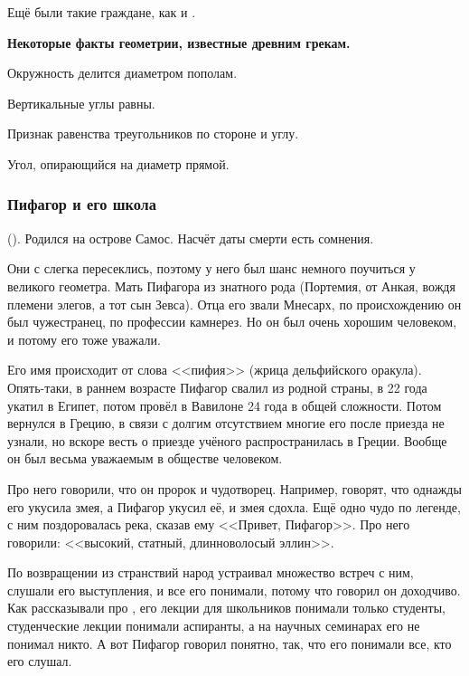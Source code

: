 \documentclass[a4paper,oneside,fleqn,10pt]{article}
\begin{document}
Ещё были такие граждане, как  и .

\textbf{Некоторые факты геометрии, известные древним грекам.}

\begin{items}{-2}
\item Окружность делится диаметром пополам.
\item Вертикальные углы равны.
\item Признак равенства треугольников по стороне и углу.
\item Угол, опирающийся на диаметр прямой.
\end{items}

\subsubsection{Пифагор и его школа}

 (). Родился на острове Самос.
Насчёт даты смерти есть сомнения.

Они с  слегка пересеклись, поэтому у него был
шанс немного поучиться у великого геометра.  Мать Пифагора из знатного
рода (Портемия, от Анкая, вождя племени элегов, а тот сын Зевса).
Отца его звали Мнесарх, по происхождению он был чужестранец, по
профессии камнерез.  Но он был очень хорошим человеком, и потому его
тоже уважали.

Его имя происходит от слова <<пифия>> (жрица дельфийского
оракула). Опять-таки, в раннем возрасте Пифагор свалил из родной
страны, в 22 года укатил в Египет, потом провёл в Вавилоне 24 года в
общей сложности. Потом вернулся в Грецию, в связи с долгим отсутствием
многие его после приезда не узнали, но вскоре весть о приезде учёного
распространилась в Греции. Вообще он был весьма уважаемым в обществе
человеком.

Про него говорили, что он пророк и чудотворец. Например, говорят, что
однажды его укусила змея, а Пифагор укусил её, и змея сдохла.  Ещё
одно чудо по легенде, с ним поздоровалась река, сказав ему <<Привет,
Пифагор>>.  Про него говорили: <<высокий, статный, длинноволосый
эллин>>.

По возвращении из странствий народ устраивал множество встреч с ним,
слушали его выступления, и все его понимали, потому что говорил он
доходчиво.  Как рассказывали про , его
лекции для школьников понимали только студенты, студенческие лекции
понимали аспиранты, а на научных семинарах его не понимал никто.  А
вот Пифагор говорил понятно, так, что его понимали все, кто его
слушал.
\end{document}
